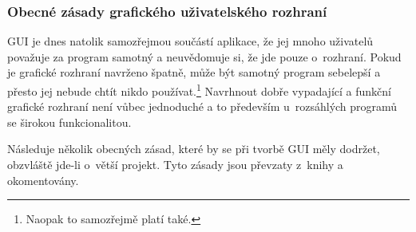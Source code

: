 \documentclass[a4paper,12pt,draft]{article}
\begin{document}
\subsubsection{Obecné zásady grafického uživatelského rozhraní}
\label{sec:GUI_zasady}
GUI je dnes natolik samozřejmou součástí aplikace, že jej mnoho
uživatelů považuje za program samotný a neuvědomuje si, že jde
pouze o~rozhraní. Pokud je grafické rozhraní navrženo špatně,
může být samotný program sebelepší a přesto jej nebude chtít nikdo
používat.\footnote{Naopak to samozřejmě platí také.} Navrhnout dobře
vypadající a funkční grafické rozhraní není vůbec jednoduché a to
především u~rozsáhlých programů se širokou funkcionalitou.

Následuje několik obecných zásad, které by se při tvorbě GUI měly
dodržet, obzvláště jde-li o~větší projekt. Tyto zásady jsou převzaty
z~knihy \cite{bloopers} a okomentovány.
\end{document}
